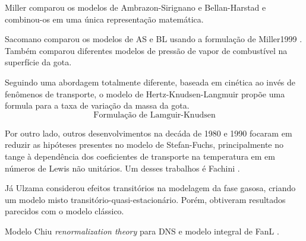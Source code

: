 Miller  comparou os modelos de Ambrazon-Sirignano e Bellan-Harstad e combinou-os em uma única representação matemática.

Sacomano  comparou os modelos de AS e BL usando a formulação de Miller1999 . 
Também comparou diferentes modelos de pressão de vapor de combustível na superfície da gota.

Seguindo uma abordagem totalmente diferente, baseada em cinética ao invés de fenômenos de transporte, o modelo de Hertz-Knudsen-Langmuir  propõe uma formula para a taxa de variação da massa da gota.
\begin{equation}
    \text{Formulação de Lamguir-Knudsen}
\end{equation}

Por outro lado, outros desenvolvimentos na decáda de 1980 e 1990 focaram em reduzir as hipóteses presentes no modelo de Stefan-Fuchs, principalmente no tange à dependência dos coeficientes de transporte na temperatura em em números de Lewis não unitários.
Um desses trabalhos é Fachini .

Já Ulzama  considerou efeitos transitórios na modelagem da fase gasosa, criando um modelo misto transitório-quasi-estacionário.
Porém, obtiveram resultados parecidos com o modelo clássico.

Modelo Chiu \emph{renormalization theory}  para DNS e modelo integral de FanL .
